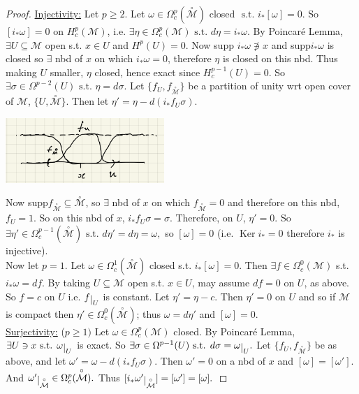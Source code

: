 \documentclass[10pt]{article}
\theoremstyle{plain}
\theoremstyle{definition}
\newcommand{\st}{\text{ s.t. }}
\newcommand{\man}{\mathcal{M}}
\newcommand{\compactpformman}[1]{\Omega^{#1}_c(\man)}
\newcommand{\deriv}{d}
\newcommand{\df}{df}
\newcommand{\deta}{\deriv\eta}
\def\restrict#1{\raise-.5ex\hbox{\ensuremath|}_{#1}}
\DeclareMathOperator{\Ker}{Ker}
\newcommand{\compactcohomman}[1]{H_c^{#1}(\man)}
\newcommand{\puncman}{\overset{\circ}{\man}}
\begin{document}
\begin{proof}
\underline{Injectivity:} Let $p\geq 2$. Let $\omega \in \Omega_c^p(\puncman)$ closed $\st i_*[\omega] = 0.$ So $[i_* \omega] = 0$ on $\compactcohomman{p}$, i.e. $\exists \eta \in \compactpformman{p} \st \deta = i_* \omega.$ By Poincar\'e Lemma, $\exists U \subseteq \man$ open s.t. $x\in U$ and $H^p(U) = 0.$ Now supp $i_*\omega \not\ni x$ and supp$i_* \omega$ is closed so $\exists$ nbd of $x$ on which $i_*\omega = 0$, therefore $\eta$ is closed on this nbd. Thus making $U$ smaller, $\eta$ closed, hence exact since $H^{p-1}_c(U) = 0$. So $\exists \sigma  \in \Omega^{p-2}(U) \st \eta = \deriv \sigma$. Let $\{f_U, f_{\puncman}\}$ be a partition of unity wrt open cover of $\man$, $\{U,\puncman\}$. Then let $\eta' = \eta - \deriv(i_*f_U \sigma)$.
\begin{center}\includegraphics[width=0.45\textwidth]{PuncturedManifoldProposition.png}\end{center}
Now supp$f_{\puncman}\subseteq \puncman$, so $\exists$ nbd of $x$ on which $f_{\puncman} = 0$ and therefore on this nbd, $f_U = 1.$ So on this nbd of $x$, $i_*f_U \sigma = \sigma$. Therefore, on $U$, $\eta' = 0.$ So $\exists \eta' \in \Omega_c ^{p-1} (\puncman) \st \deta ' = \deta = \omega,$ so $[\omega] = 0$ (i.e. $\Ker i_* = 0$ therefore $i_*$ is injective).\\
Now let $p = 1.$ Let $\omega \in \Omega_c^1(\puncman) $ closed s.t. $i_* [ \omega ] = 0.$ Then $\exists f \in \Omega_c^0(\man)$ s.t. $i_*\omega = \df$. By taking $U \subseteq \man $ open s.t. $x\in U$, may assume $\df = 0$ on $U$, as above. So $f = c$ on $U$ i.e. $f\restrict{U}$ is constant. Let $\eta' = \eta -c$. Then $\eta' = 0$ on $U$ and so if $\man$ is compact then $\eta' \in \Omega_c^0(\puncman)$; thus $\omega = \deta' $ and $[\omega] = 0$.\\
\underline{Surjectivity:} ($p\geq 1)$ Let $\omega \in \compactpformman{p}$ closed. By Poincar\'e Lemma, $\exists U \ni x \st \omega \restrict{U} $ is exact. So $\exists \sigma \in \Omega^{p-1}(U) \st \deriv \sigma = \omega \restrict{U}.$ Let $\{f_U, f_{\puncman}\}$ be as above, and let $\omega' = \omega - \deriv(i_* f_U \sigma)$. Then $\omega ' = 0 $ on a nbd of $x$ and $[\omega ] = [\omega ' ].$ And $\omega ' \restrict{\puncman} \in \Omega_c^p(\puncman).$ Thus $[i_*\omega' \restrict{\puncman}] = [\omega'] = [\omega].$
\end{proof}
\end{document}
